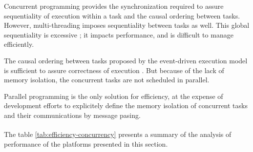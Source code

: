 
Concurrent programming provides the synchronization required to assure sequentiality of execution within a task and the causal ordering between tasks.
However, multi-threading imposes sequentiality between tasks as well.
This global sequentiality is excessive ; it impacts performance, and is difficult to manage efficiently.

The causal ordering between tasks proposed by the event-driven execution model is sufficient to assure correctness of execution \cite{Lamport1978,Reed2012}.
But because of the lack of memory isolation, the concurrent tasks are not scheduled in parallel.

Parallel programming is the only solution for efficiency, at the expense of development efforts to explicitely define the memory isolation of concurrent tasks and their communications by message pasing.


\paragraph{}

The table \ref{tab:efficiency-concurrency} presents a summary of the analysis of performance of the platforms presented in this section.









